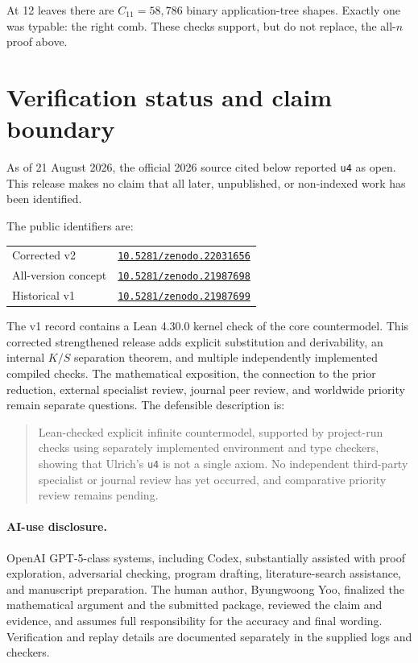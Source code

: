 \documentclass[11pt]{article}
\begin{document}
At 12 leaves there are $C_{11}=58{,}786$ binary application-tree shapes.
Exactly one was typable: the right comb.  These checks support, but do not
replace, the all-$n$ proof above.

\section{Verification status and claim boundary}

As of 21 August 2026, the official 2026 source cited below reported
\texttt{u4} as open.  This release makes no claim that all later, unpublished,
or non-indexed work has been identified.

The public identifiers are:
\begin{center}
\begin{tabular}{@{}ll@{}}
Corrected v2 &
\href{https://doi.org/10.5281/zenodo.22031656}{\texttt{10.5281/zenodo.22031656}}\\
All-version concept &
\href{https://doi.org/10.5281/zenodo.21987698}{\texttt{10.5281/zenodo.21987698}}\\
Historical v1 &
\href{https://doi.org/10.5281/zenodo.21987699}{\texttt{10.5281/zenodo.21987699}}\\
\end{tabular}
\end{center}
The v1 record contains a Lean 4.30.0 kernel check of the core countermodel.
This corrected
strengthened release adds explicit substitution and derivability, an internal
$K/S$ separation theorem, and multiple independently implemented compiled
checks.  The mathematical exposition, the connection to the prior reduction,
external specialist review, journal peer review, and worldwide priority remain
separate questions.  The defensible description is:

\begin{quote}
Lean-checked explicit infinite countermodel, supported by project-run checks
using separately implemented environment and type checkers, showing that
Ulrich's \texttt{u4} is not a single axiom.  No independent third-party
specialist or journal review has yet occurred, and comparative priority review
remains pending.
\end{quote}

\paragraph{AI-use disclosure.}
OpenAI GPT-5-class systems, including Codex, substantially assisted with proof
exploration, adversarial checking, program drafting, literature-search
assistance, and manuscript preparation.  The human author, Byungwoong Yoo, finalized the
mathematical argument and the submitted package, reviewed the claim and
evidence, and assumes full responsibility for the accuracy and final wording.
Verification and replay details are documented separately in the supplied logs
and checkers.
\end{document}
